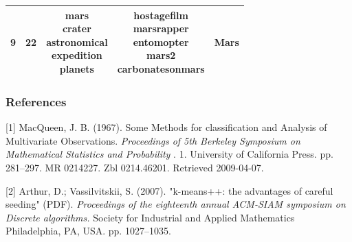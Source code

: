 \documentclass{article} %
\begin{document}
\begin{table}[!b]
\begin{center}
\begin{tabular}{ | c | c | c | c | c | }
9 & 22 & \parbox[t]{2cm}{mars \\ crater \\ astronomical \\ expedition \\ planets} & \parbox[t]{5cm}{hostagefilm \\ marsrapper \\ entomopter \\ mars2 \\ carbonatesonmars} & Mars \\ \hline 
 
\end{tabular}
\end{center}
\end{table}

\clearpage

\subsubsection*{References}

\small{
[1] MacQueen, J. B. (1967). Some Methods for classification and Analysis of Multivariate Observations. {\it Proceedings of 5th Berkeley Symposium on Mathematical Statistics and Probability }. 1. University of California Press. pp. 281–297. MR 0214227. Zbl 0214.46201. Retrieved 2009-04-07.

[2] Arthur, D.; Vassilvitskii, S. (2007). "k-means++: the advantages of careful seeding" (PDF). {\it Proceedings of the eighteenth annual ACM-SIAM symposium on Discrete algorithms.} Society for Industrial and Applied Mathematics Philadelphia, PA, USA. pp. 1027–1035.
}
\end{document}
